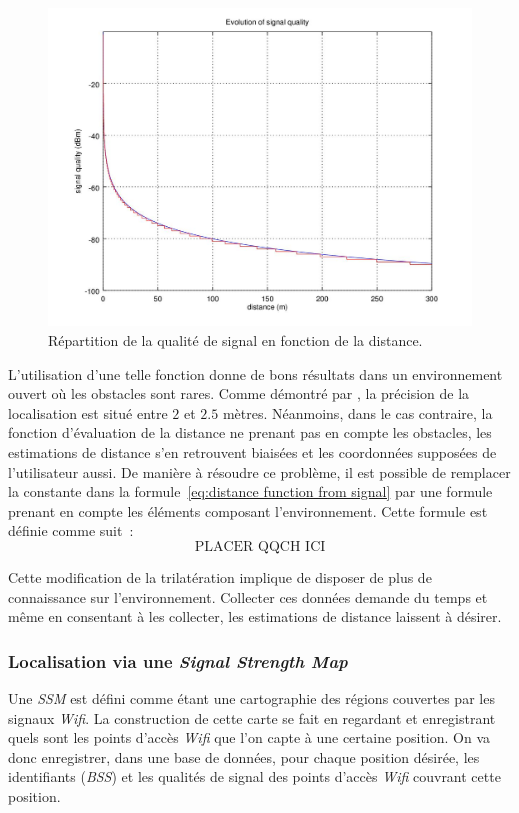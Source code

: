 \documentclass[10pt,journal,compsoc]{IEEEtran}
\begin{document}
      \begin{figure}
        \includegraphics[scale=0.4]{images/signal-propagation.jpg}
        \caption{Répartition de la qualité de signal en fonction de la distance.}
      \end{figure}

	  L'utilisation d'une telle fonction donne de bons résultats dans un environnement ouvert où les obstacles sont rares. Comme démontré par \cite{Roumanie},
	  la précision de la localisation est situé entre $2$ et $2.5$ mètres. Néanmoins, dans le cas contraire, la fonction d'évaluation de la distance ne prenant
	  pas en compte les obstacles, les estimations de distance s'en retrouvent biaisées et les coordonnées supposées de l'utilisateur aussi. De manière à résoudre
	  ce problème, il est possible de remplacer la constante dans la formule~\eqref{eq:distance function from signal} par une formule prenant en compte les éléments
	  composant l'environnement. Cette formule est définie comme suit~:
      \begin{equation}
        \text{PLACER QQCH ICI} %
      \end{equation}

	  Cette modification de la trilatération implique de disposer de plus de connaissance sur l'environnement. Collecter ces données demande du temps et même en
	  consentant à les collecter, les estimations de distance laissent à désirer.

    \subsubsection{Localisation via une \textit{Signal Strength Map}}
      Une \textit{SSM} est défini comme étant une cartographie des régions couvertes par les signaux \textit{Wifi}. La construction de cette carte se fait en regardant
	  et enregistrant quels sont les points d'accès \textit{Wifi} que l'on capte à une certaine position. On va donc enregistrer, dans une base de données, pour chaque
	  position désirée, les identifiants (\textit{BSS}) et les qualités de signal des points d'accès \textit{Wifi} couvrant cette position.
\end{document}
